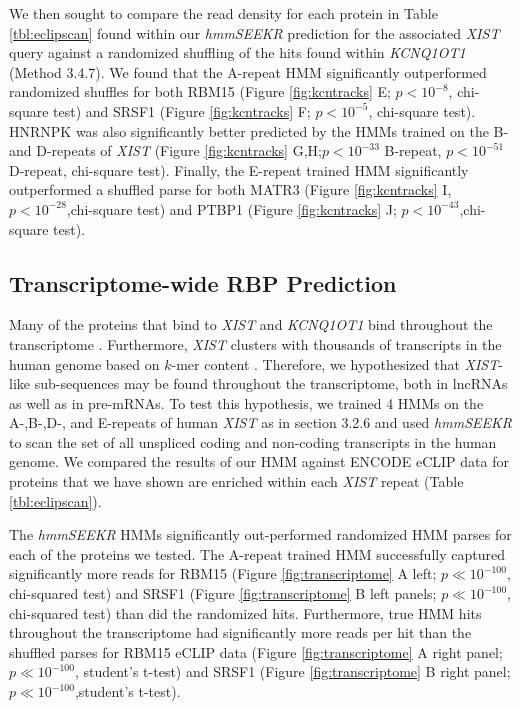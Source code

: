We then sought to compare the read density for each protein in Table \ref{tbl:eclipscan} found within our \emph{hmmSEEKR} prediction for the associated \emph{XIST} query against a randomized shuffling of the hits found within \emph{KCNQ1OT1} (Method 3.4.7). We found that the A-repeat HMM significantly outperformed randomized shuffles for both RBM15 (Figure \ref{fig:kcntracks} E; $p< 10^{-8}$, chi-square test) and SRSF1 (Figure \ref{fig:kcntracks} F; $p< 10^{-5}$, chi-square test). HNRNPK was also significantly better predicted by the HMMs trained on the B- and D-repeats of \emph{XIST} (Figure \ref{fig:kcntracks} G,H;$p<10^{-33}$ B-repeat, $p<10^{-51}$ D-repeat, chi-square test). Finally, the E-repeat trained HMM significantly outperformed a shuffled parse for both MATR3 (Figure \ref{fig:kcntracks} I, $p<10^{-28}$,chi-square test) and PTBP1 (Figure \ref{fig:kcntracks} J; $p<10^{-43}$,chi-square test). 

\clearpage



\subsection{Transcriptome-wide RBP Prediction}
Many of the proteins that bind to \emph{XIST} and \emph{KCNQ1OT1} bind throughout the transcriptome \cite{VanNostrand2016RobusteCLIP}. Furthermore, \emph{XIST} clusters with thousands of transcripts in the human genome based on $k$-mer content \cite{Kirk2018FunctionalContent}. Therefore, we hypothesized that \emph{XIST}-like sub-sequences may be found throughout the transcriptome, both in lncRNAs as well as in pre-mRNAs. To test this hypothesis, we trained 4 HMMs on the A-,B-,D-, and E-repeats of human \emph{XIST} as in section 3.2.6 and used \emph{hmmSEEKR} to scan the set of all unspliced coding and non-coding transcripts in the human genome. We compared the results of our HMM against ENCODE eCLIP data for proteins that we have shown are enriched within each \emph{XIST} repeat (Table \ref{tbl:eclipscan}). 

The \emph{hmmSEEKR} HMMs significantly out-performed randomized HMM parses for each of the proteins we tested. The A-repeat trained HMM successfully captured significantly more reads for RBM15 (Figure \ref{fig:transcriptome} A left; $p\ll 10^{-100}$, chi-squared test) and SRSF1 (Figure \ref{fig:transcriptome} B left panels; $p\ll 10^{-100}$, chi-squared test) than did the randomized hits. Furthermore, true HMM hits throughout the transcriptome had significantly more reads per hit than the shuffled parses for RBM15 eCLIP data (Figure \ref{fig:transcriptome} A right panel; $p\ll10^{-100}$, student's t-test) and SRSF1 (Figure \ref{fig:transcriptome} B right panel; $p\ll10^{-100}$,student's t-test).

